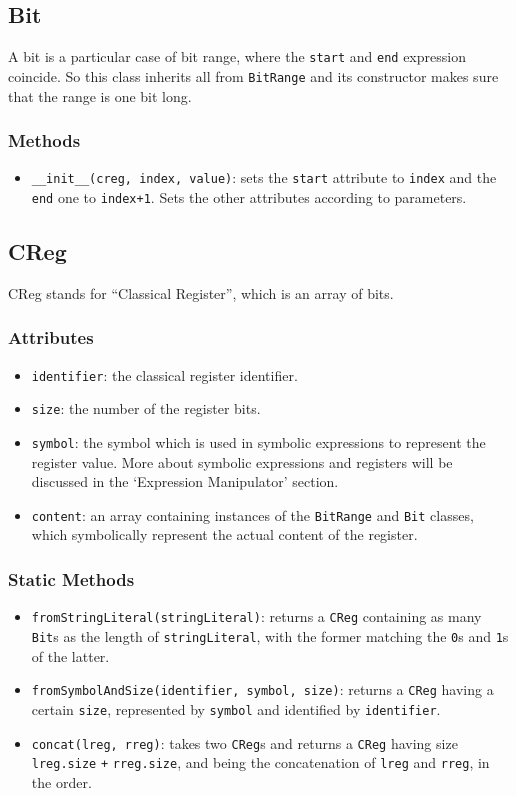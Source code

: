 \documentclass[12pt,a4paper]{report}
\theoremstyle{definition}
\theoremstyle{definition}
\theoremstyle{definition}
\begin{document}
\subsection{Bit}
A bit is a particular case of bit range, where the \texttt{start} and \texttt{end} expression coincide. So this class inherits all from \texttt{BitRange} and its constructor makes sure that the range is one bit long.
\subsubsection{Methods}
\begin{itemize}
    \itemsep 0em
    \item \texttt{\_\_init\_\_(creg, index, value)}: sets the \texttt{start} attribute to \texttt{index} and the \texttt{end} one to \texttt{index+1}. Sets the other attributes according to parameters.
\end{itemize}




\subsection{CReg}
CReg stands for ``Classical Register'', which is an array of bits.
\subsubsection{Attributes}
\begin{itemize}
    \itemsep 0em
    \item \texttt{identifier}: the classical register identifier.
    \item \texttt{size}: the number of the register bits.
    \item \texttt{symbol}: the symbol which is used in symbolic expressions to represent the register value. More about symbolic expressions and registers will be discussed in the `Expression Manipulator' section.
    \item \texttt{content}: an array containing instances of the \texttt{BitRange} and \texttt{Bit} classes, which symbolically represent the actual content of the register.
\end{itemize}
\subsubsection{Static Methods}
\begin{itemize}
    \item \texttt{fromStringLiteral(stringLiteral)}: returns a \texttt{CReg} containing as many \texttt{Bit}s as the length of \texttt{stringLiteral}, with the former matching the \texttt{0}s and \texttt{1}s of the latter.
    \item \texttt{fromSymbolAndSize(identifier, symbol, size)}: returns a \texttt{CReg} having a certain \texttt{size}, represented by \texttt{symbol} and identified by \texttt{identifier}.
    \item \texttt{concat(lreg, rreg)}: takes two \texttt{CReg}s and returns a \texttt{CReg} having size \texttt{lreg.size} \texttt{+} \texttt{rreg.size}, and being the concatenation of \texttt{lreg} and \texttt{rreg}, in the order.
\end{itemize}
\end{document}
